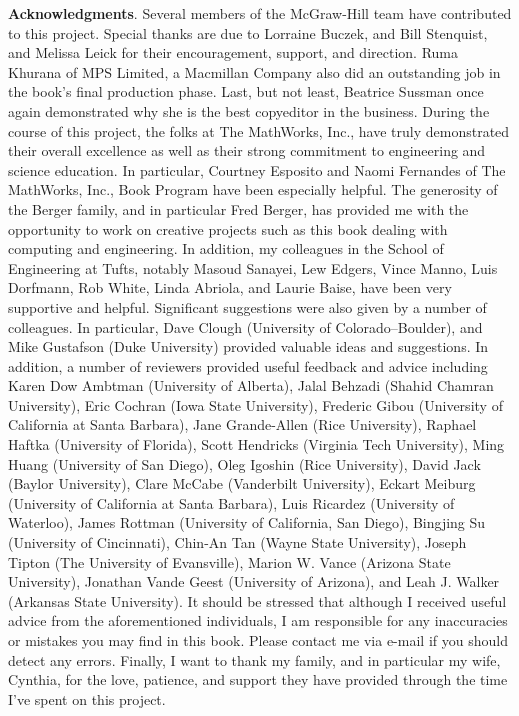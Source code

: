 \documentclass[../main.tex]{subfiles}
\begin{document}
\textbf{Acknowledgments}. Several members of the McGraw-Hill team have contributed to
this project. Special thanks are due to Lorraine Buczek, and Bill Stenquist, and Melissa
Leick for their encouragement, support, and direction. Ruma Khurana of MPS Limited, a
Macmillan Company also did an outstanding job in the book’s final production phase. Last,
but not least, Beatrice Sussman once again demonstrated why she is the best copyeditor in
the business.
During the course of this project, the folks at The MathWorks, Inc., have truly demonstrated their overall excellence as well as their strong commitment to engineering and
science education. In particular, Courtney Esposito and Naomi Fernandes of The MathWorks, Inc., Book Program have been especially helpful.
The generosity of the Berger family, and in particular Fred Berger, has provided me
with the opportunity to work on creative projects such as this book dealing with computing
and engineering. In addition, my colleagues in the School of Engineering at Tufts, notably
Masoud Sanayei, Lew Edgers, Vince Manno, Luis Dorfmann, Rob White, Linda Abriola,
and Laurie Baise, have been very supportive and helpful.
Significant suggestions were also given by a number of colleagues. In particular, Dave
Clough (University of Colorado–Boulder), and Mike Gustafson (Duke University) provided valuable ideas and suggestions. In addition, a number of reviewers provided useful
feedback and advice including Karen Dow Ambtman (University of Alberta), Jalal Behzadi
(Shahid Chamran University), Eric Cochran (Iowa State University), Frederic Gibou (University of California at Santa Barbara), Jane Grande-Allen (Rice University), Raphael
Haftka (University of Florida), Scott Hendricks (Virginia Tech University), Ming Huang
(University of San Diego), Oleg Igoshin (Rice University), David Jack (Baylor University), Clare McCabe (Vanderbilt University), Eckart Meiburg (University of California at
Santa Barbara), Luis Ricardez (University of Waterloo), James Rottman (University of
California, San Diego), Bingjing Su (University of Cincinnati), Chin-An Tan (Wayne State
University), Joseph Tipton (The University of Evansville), Marion W. Vance (Arizona
State University), Jonathan Vande Geest (University of Arizona), and Leah J. Walker
(Arkansas State University).
It should be stressed that although I received useful advice from the aforementioned
individuals, I am responsible for any inaccuracies or mistakes you may find in this book.
Please contact me via e-mail if you should detect any errors.
Finally, I want to thank my family, and in particular my wife, Cynthia, for the love,
patience, and support they have provided through the time I’ve spent on this project.
\newpage
\end{document}
